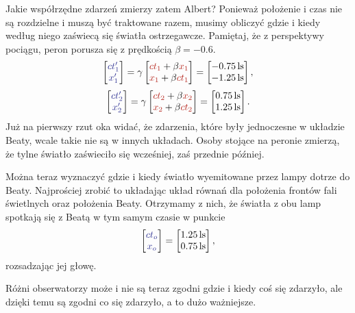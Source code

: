 \documentclass[10pt,twocolumn,fleqn,polish]{article}
\providecommand{\mathcolor}[2]{{\color{#1}#2}}
\newcommand{\mred}[1]{\mathcolor{BrickRed}{#1}}
\newcommand{\mblue}[1]{\mathcolor{Blue}{#1}}
\begin{document}
Jakie współrzędne zdarzeń zmierzy zatem Albert? Ponieważ położenie i czas nie są
rozdzielne i muszą być traktowane razem, musimy obliczyć gdzie i kiedy według
niego zaświecą się światła ostrzegawcze.
Pamiętaj, że z perspektywy pociągu, peron porusza się z prędkością $\beta = -0.6$.
\[
  \begin{bmatrix}\mblue{ct_1'} \\ \mblue{x_1'}\end{bmatrix} =
  \gamma\begin{bmatrix}
    \mred{ct_1} + \beta \mred{x_1} \\
    \mred{x_1} + \beta \mred{ct_1}
  \end{bmatrix} =
  \begin{bmatrix}\SI{-0.75}{ls} \\ \SI{-1.25}{ls}\end{bmatrix},
\]
\[
  \begin{bmatrix}\mblue{ct_2'} \\ \mblue{x_2'}\end{bmatrix} =
  \gamma\begin{bmatrix}
    \mred{ct_2} + \beta \mred{x_2} \\
    \mred{x_2} + \beta \mred{ct_2}
  \end{bmatrix} =
  \begin{bmatrix}\SI{0.75}{ls} \\ \SI{1.25}{ls}\end{bmatrix}.
\]
Już na pierwszy rzut oka widać, że zdarzenia, które były jednoczesne w układzie
Beaty, wcale takie nie są w innych układach. Osoby stojące na peronie zmierzą,
że tylne światło zaświeciło się wcześniej, zaś przednie później.

Można teraz wyznaczyć gdzie i kiedy światło wyemitowane przez
lampy dotrze do Beaty. Najprościej zrobić to układając układ równań dla położenia
frontów fali świetlnych oraz położenia Beaty.
Otrzymamy z nich, że światła z obu lamp spotkają się z Beatą w tym samym czasie
w punkcie
\[ \begin{bmatrix}\mblue{ct_o} \\ \mblue{x_o}\end{bmatrix} =
  \begin{bmatrix}
    \SI{1.25}{ls} \\ \SI{0.75}{ls}
  \end{bmatrix}, \]
rozsadzając jej głowę.

Różni obserwatorzy może i nie są teraz zgodni gdzie i kiedy coś się zdarzyło,
ale dzięki temu są zgodni co się zdarzyło, a to dużo ważniejsze.
\newpage
\end{document}
